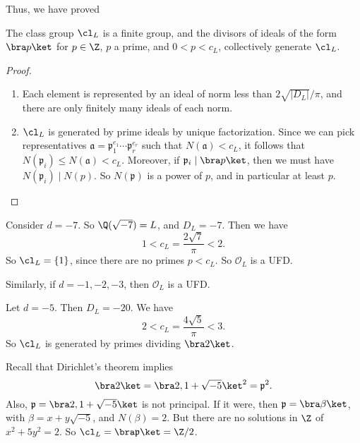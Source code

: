 \documentclass[a4paper]{article}
\begin{document}
Thus, we have proved
\begin{thm}
  The class group $\cl_L$ is a finite group, and the divisors of ideals of the form $\bra p\ket$ for $p \in \Z$, $p$ a prime, and $0 < p < c_L$, collectively generate $\cl_L$.
\end{thm}

\begin{proof}\leavevmode
  \begin{enumerate}
    \item Each element is represented by an ideal of norm less than $2\sqrt{|D_L|}/\pi$, and there are only finitely many ideals of each norm.
    \item $\cl_L$ is generated by prime ideals by unique factorization. Since we can pick representatives $\mathfrak{a}= \mathfrak{p}_1^{e_1} \cdots \mathfrak{p}_r^{e_r}$ such that $N(\mathfrak{a}) < c_L$, it follows that $N(\mathfrak{p}_i) \leq N(\mathfrak{a}) < c_L$. Moreover, if $\mathfrak{p}_i \mid \bra p\ket$, then we must have $N(\mathfrak{p}_i) \mid N(p)$. So $N(\mathfrak{p})$ is a power of $p$, and in particular at least $p$.
  \end{enumerate}
\end{proof}

\begin{eg}
  Consider $d = -7$. So $\Q(\sqrt{-7}) = L$, and $D_L = -7$. Then we have
  \[
    1 < c_L = \frac{2\sqrt{7}}{\pi} < 2.
  \]
  So $\cl_L = \{1\}$, since there are no primes $p < c_L$. So $\mathcal{O}_L$ is a UFD.

  Similarly, if $d = -1, -2, -3$, then $\mathcal{O}_L$ is a UFD.
\end{eg}

\begin{eg}
  Let $d = -5$. Then $D_L = -20$. We have
  \[
    2 < c_L = \frac{4\sqrt{5}}{\pi} < 3.
  \]
  So $\cl_L$ is generated by primes dividing $\bra 2\ket$.

  Recall that Dirichlet's theorem implies
  \[
    \bra 2\ket = \bra 2, 1 + \sqrt{-5}\ket^2 = \mathfrak{p}^2.
  \]
  Also, $\mathfrak{p} = \bra 2, 1 + \sqrt{-5}\ket$ is not principal. If it were, then $\mathfrak{p} = \bra \beta\ket$, with $\beta = x + y \sqrt{-5}$, and $N(\beta) = 2$. But there are no solutions in $\Z$ of $x^2 + 5y^2 = 2$. So $\cl_L = \bra \mathfrak{p}\ket = \Z/2$.
\end{eg}
\end{document}
